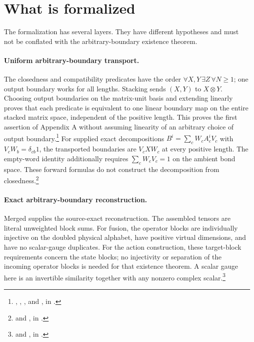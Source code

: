 \documentclass{article}
\begin{document}
\section{What is formalized}

The formalization has several layers. They have different hypotheses and
must not be conflated with the arbitrary-boundary existence theorem.

\paragraph{Uniform arbitrary-boundary transport.}
The closedness and compatibility predicates have the order
$\forall X,Y\,\exists Z\,\forall N\geq1$; one output boundary works for
all lengths. Stacking sends $(X,Y)$ to $X\otimes Y$.
Choosing output boundaries on the matrix-unit basis and extending linearly
proves that each predicate is equivalent to one linear boundary map on
the entire stacked matrix space, independent of the positive length.
This proves the first assertion of Appendix A without assuming linearity
of an arbitrary choice of output boundary.\footnote{
    ,
    ,
    , and
    , in
    .}
For supplied exact decompositions
$B^i=\sum_cW_cA_c^iV_c$ with $V_cW_b=\delta_{cb}1$, the transported
boundaries are $V_cXW_c$ at every positive length. The empty-word identity
additionally requires $\sum_cW_cV_c=1$ on the ambient bond space.
These forward formulas do not construct the decomposition from
closedness.\footnote{
    and , in
    .}

\paragraph{Exact arbitrary-boundary reconstruction.}
Merged  supplies the source-exact reconstruction. The assembled
tensors are literal unweighted block sums. For fusion, the operator blocks
are individually injective on the doubled physical alphabet, have positive
virtual dimensions, and have no scalar-gauge duplicates. For the action
construction, these target-block requirements concern the state blocks;
no injectivity or separation of the incoming operator blocks is needed
for that existence theorem. A scalar gauge here is an invertible similarity
together with any nonzero complex scalar.\footnote{
    and
    ,
    in .}
\end{document}
